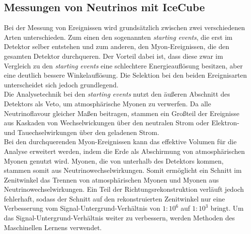 \subsection{Messungen von Neutrinos mit IceCube}
Bei der Messung von Ereignissen wird grundsätzlich zwischen zwei verschiedenen Arten unterschieden. Zum einen den sogenannten \textit{starting events}, die erst im Detektor selber entstehen und zum anderen, den Myon-Ereignissen, die den gesamten Detektor durchqueren. Der Vorteil dabei ist, dass diese zwar im Vergleich zu den \textit{starting events} eine schlechtere Energieauflösung besitzen, aber eine deutlich bessere Winkelauflösung. Die Selektion bei den beiden Ereignisarten unterscheidet sich jedoch grundlegend.\\
Die Analysetechnik bei den \textit{starting events} nutzt den äußeren Abschnitt des Detektors als Veto, um atmosphärische Myonen zu verwerfen. Da alle Neutrinoflavour gleicher Maßen beitragen, stammen ein Großteil der Ereignisse aus Kaskaden von Wechselwickungen über den neutralen Strom oder Elektron- und Tauechselwirkungen über den geladenen Strom.\\
Bei den durchquerenden Myon-Ereignissen kann das effektive Volumen für die Analyse erweitert werden, indem die Erde als Abschirmung von atmosphärischen Myonen genutzt wird. Myonen, die von unterhalb des Detektors kommen, stammen somit aus Neutrinowechselwirkungen. Somit ermöglicht ein Schnitt im Zenitwinkel das Trennen von atmosphärischen Myonen und Myonen aus Neutrinowechselwirkungen. Ein Teil der Richtungsrekonstruktion verläuft jedoch fehlerhaft, sodass der Schnitt auf den rekonstruierten Zenitwinkel nur eine Verbesserung vom Signal-Untergrund-Verhältnis von $1:10^{6}$ auf $1:10^{3}$ bringt. Um das Signal-Untergrund-Verhältnis weiter zu verbessern, werden Methoden des Maschinellen Lernens verwendet.

